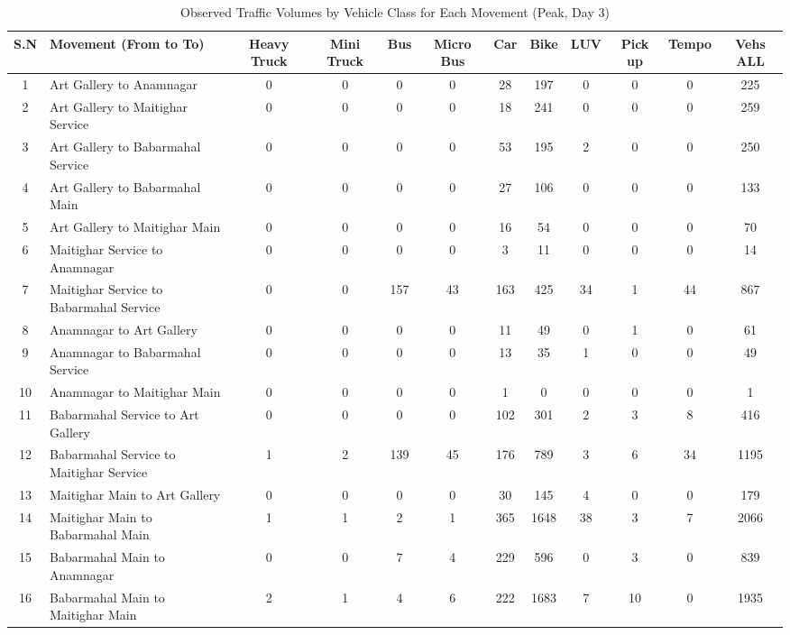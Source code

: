 \begin{landscape}
\begin{table}[h!]
\centering
\caption{Observed Traffic Volumes by Vehicle Class for Each Movement (Peak, Day 3)}
\small
\setlength{\tabcolsep}{5pt}

\begin{tabular}{|c|p{6cm}|c|c|c|c|c|c|c|c|c|c|}
\hline
S.N& Movement (From to To)& Heavy Truck & Mini Truck & Bus & Micro Bus & Car & Bike & LUV & Pick up & Tempo & Vehs ALL \\ \hline
1	&Art Gallery to Anamnagar	&0	&0	&0	&0	&28	&197	&0	&0	&0	&225 \\ \hline
2	&Art Gallery to Maitighar Service	&0	&0	&0	&0	&18	&241	&0	&0	&0	&259 \\ \hline
3	&Art Gallery to Babarmahal Service	&0	&0	&0	&0	&53	&195	&2	&0	&0	&250 \\ \hline
4	&Art Gallery to Babarmahal Main	&0	&0	&0	&0	&27	&106	&0	&0	&0	&133 \\ \hline
5	&Art Gallery to Maitighar Main	&0	&0	&0	&0	&16	&54	&0	&0	&0	&70 \\ \hline
6	&Maitighar Service to Anamnagar	&0	&0	&0	&0	&3	&11	&0	&0	&0	&14 \\ \hline
7	&Maitighar Service to Babarmahal Service	&0	&0	&157	&43	&163	&425	&34	&1	&44	&867 \\ \hline
8	&Anamnagar to Art Gallery	&0	&0	&0	&0	&11	&49	&0	&1	&0	&61 \\ \hline
9	&Anamnagar to Babarmahal Service	&0	&0	&0	&0	&13	&35	&1	&0	&0	&49 \\ \hline
10	&Anamnagar to Maitighar Main	&0	&0	&0	&0	&1	&0	&0	&0	&0	&1 \\ \hline
11	&Babarmahal Service to Art Gallery	&0	&0	&0	&0	&102	&301	&2	&3	&8	&416 \\ \hline
12	&Babarmahal Service to Maitighar Service	&1	&2	&139	&45	&176	&789	&3	&6	&34	&1195 \\ \hline
13	&Maitighar Main to Art Gallery	&0	&0	&0	&0	&30	&145	&4	&0	&0	&179 \\ \hline
14	&Maitighar Main to Babarmahal Main	&1	&1	&2	&1	&365	&1648	&38	&3	&7	&2066 \\ \hline
15	&Babarmahal Main to Anamnagar	&0	&0	&7	&4	&229	&596	&0	&3	&0	&839 \\ \hline
16	&Babarmahal Main to Maitighar Main	&2	&1	&4	&6	&222	&1683	&7	&10	&0	&1935 \\ \hline

\end{tabular}
\end{table}
\end{landscape}

